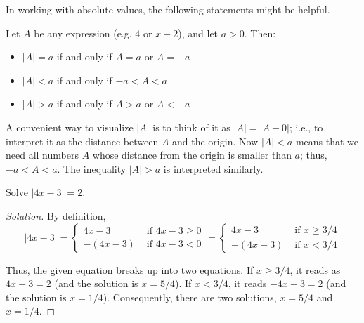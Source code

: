 \documentclass{ximera}
\begin{document}
In working with absolute values, the following statements might be helpful.
\begin{theorem}
  Let $A$ be any expression (e.g. $4$ or $x+2$), and let $a>0$. Then:
  \begin{itemize}
    \item $|A| = a$ if and only if $A = a$ or $A = -a$
    \item $|A| < a$ if and only if $-a < A < a$
    \item $|A| > a$ if and only if $A > a$ or $A < -a$
  \end{itemize}
\end{theorem}

A convenient way to visualize $|A|$ is to think of it as $|A| = |A - 0|$; i.e., to interpret it as the distance between $A$ and the origin.  Now $|A| < a$ means that
we need all numbers $A$ whose distance from the origin is smaller than $a$; thus, $-a < A < a$.  The inequality $|A| > a$ is interpreted similarly.

\begin{example}
Solve $|4x-3| = 2$.
\end{example}
\begin{proof}[Solution]
By definition,
\[ |4x-3| = \begin{cases} 4x-3 & \textrm{ if } 4x-3 \geq 0\\ -(4x-3) &\textrm{ if } 4x-3 < 0\end{cases}
		= \begin{cases} 4x-3 & \textrm{ if } x \geq 3/4\\ -(4x-3) &\textrm{ if } x < 3/4\end{cases} \]

Thus, the given equation breaks up into two equations.  If $x \geq 3/4$, it reads as $4x-3=2$ (and the solution is $x = 5/4$).  If $x < 3/4$, it reads
$-4x+3 = 2$ (and the solution is $x=1/4$).  Consequently, there are two solutions, $x=5/4$ and $x=1/4$.
\end{proof}
\end{document}
